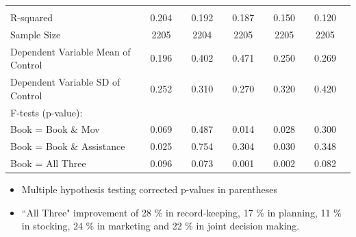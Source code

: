 \documentclass[hideothersubsections, usenames,dvipsnames,11pt]{beamer}
\begin{document}
\begin{frame}
{{\begin{table}[t]
\begin{tabular}{l*{10}{c}}
\hline         							
\\
R-squared									&               0.204   	 &&          0.192   	&&           0.187   	&&           0.150	 &&           0.120             \\
Sample Size 								&               2205   	  &&          2204   	   &&         2205   	 &&           2205   	    &&        2205      \\
Dependent Variable Mean of Control 		&                  0.196  	  &&         0.402   	 &&          0.471    &&	           0.250    	 &&          0.269          \\
Dependent Variable SD of Control 			&              0.252    	 &&          0.310   	  &&         0.270      	  &&         0.320    && 	           0.420        	\\
F-tests (p-value):							&			&&			&&			&&			\\
\hspace{5mm}Book = Book \& Mov				        &               0.069   	   &&           0.487   	  &&          0.014     	  &&          0.028    	 &&          0.300           \\
\hspace{5mm}Book = Book \& Assistance				        &               0.025  	  &&          0.754     	 &&           0.304   	 &&          0.030    	  &&          0.348                 \\
\hspace{5mm}Book = All Three				        &                  0.096    	  &&         0.073    	    &&      0.001   	  &&         0.002    &&	         0.082        \\
\hline
	\end{tabular}
\end{table}}}
\begin{itemize}
\item[] \tiny Multiple hypothesis testing corrected p-values in parentheses
\end{itemize}

\begin{itemize}
\item \small ``All Three" improvement of 28 \% in record-keeping, 17 \% in planning, 11 \% in stocking, 24 \% in marketing and 22 \% in joint decision making.
\end{itemize}

\end{frame}
\end{document}
